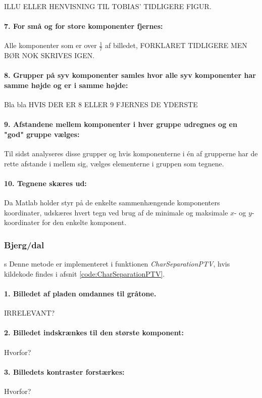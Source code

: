 ILLU ELLER HENVISNING TIL TOBIAS' TIDLIGERE FIGUR.

\paragraph{7. For små og for store komponenter fjernes:} Alle komponenter som er over $\frac{1}{7}$ af billedet, FORKLARET TIDLIGERE MEN BØR NOK SKRIVES IGEN.

\paragraph{8. Grupper på syv komponenter samles hvor alle syv komponenter har samme højde og er i samme højde:} Bla bla HVIS DER ER 8 ELLER 9 FJERNES DE YDERSTE

\paragraph{9. Afstandene mellem komponenter i hver gruppe udregnes og en "god" gruppe vælges:}
Til sidst analyseres disse grupper og hvis komponenterne i én af grupperne har de rette afstande i mellem sig, vælges elementerne i gruppen som tegnene.

\paragraph{10. Tegnene skæres ud:} Da Matlab holder styr på de enkelte sammenhængende komponenters koordinater, udskæres hvert tegn ved brug af de minimale og maksimale $x$- og $y$-koordinater for den enkelte komponent.

\subsubsection*{Bjerg/dal}
s
Denne metode er implementeret i funktionen \textit{CharSeparationPTV}, hvis kildekode findes i afsnit \vref{code:CharSeparationPTV}.

\paragraph{1. Billedet af pladen omdannes til gråtone.} IRRELEVANT?

\paragraph{2. Billedet indskrænkes til den største komponent:}
Hvorfor?

\paragraph{3. Billedets kontraster forstærkes:}
Hvorfor?

